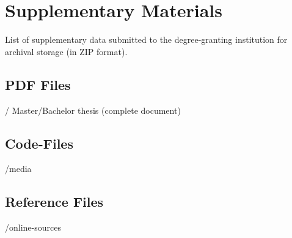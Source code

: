 \chapter{Supplementary Materials}
\label{app:materials}


List of supplementary data submitted to the degree-granting institution for archival storage
(in ZIP format).


\section{PDF Files}
\begin{FileList}{/}
 Master/Bachelor thesis (complete document)
\end{FileList}

\section{Code-Files}
\begin{FileList}{/media}
\fitem{}
\end{FileList}


\section{Reference Files}
\begin{FileList}{/online-sources}
\fitem{}
\end{FileList}




